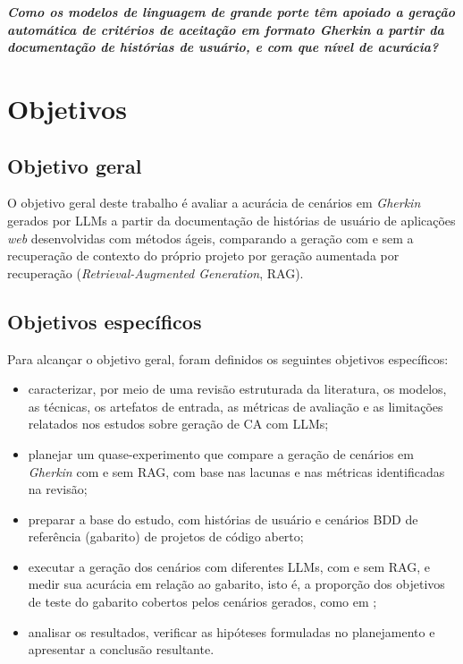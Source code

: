 \begin{center}
\textbf{\textit{Como os modelos de linguagem de grande porte têm apoiado a geração automática de critérios de aceitação em formato Gherkin a partir da documentação de histórias de usuário, e com que nível de acurácia?}}
\end{center}

\section{Objetivos}
\label{sec:objetivos}

\subsection{Objetivo geral}

O objetivo geral deste trabalho é avaliar a acurácia de cenários em \textit{Gherkin} gerados por LLMs a partir da documentação de histórias de usuário de aplicações \textit{web} desenvolvidas com métodos ágeis, comparando a geração com e sem a recuperação de contexto do próprio projeto por geração aumentada por recuperação (\textit{Retrieval-Augmented Generation}, RAG).

\subsection{Objetivos específicos}

Para alcançar o objetivo geral, foram definidos os seguintes objetivos específicos:

\begin{itemize}
  \item caracterizar, por meio de uma revisão estruturada da literatura, os modelos, as técnicas, os artefatos de entrada, as métricas de avaliação e as limitações relatados nos estudos sobre geração de CA com LLMs;
  \item planejar um quase-experimento que compare a geração de cenários em \textit{Gherkin} com e sem RAG, com base nas lacunas e nas métricas identificadas na revisão;
  \item preparar a base do estudo, com histórias de usuário e cenários BDD de referência (gabarito) de projetos de código aberto;
  \item executar a geração dos cenários com diferentes LLMs, com e sem RAG, e medir sua acurácia em relação ao gabarito, isto é, a proporção dos objetivos de teste do gabarito cobertos pelos cenários gerados, como em ;
  \item analisar os resultados, verificar as hipóteses formuladas no planejamento e apresentar a conclusão resultante.
\end{itemize}

